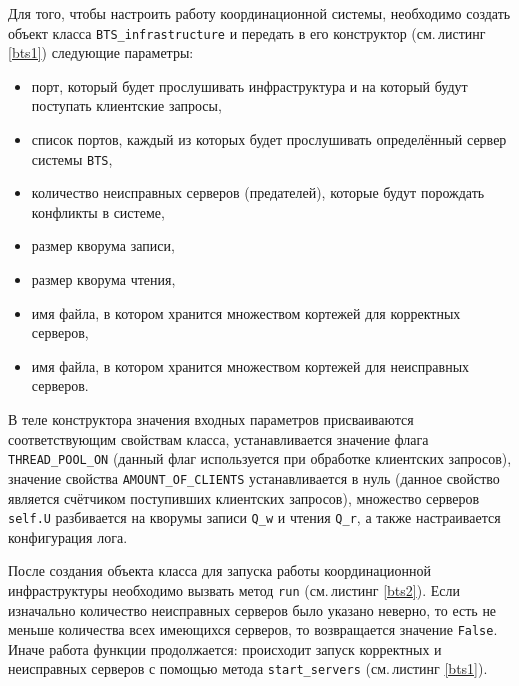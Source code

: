 Для того, чтобы настроить работу координационной системы, необходимо создать объект класса \texttt{BTS_infrastructure} и передать в его конструктор (см.\,листинг \ref{bts1}) следующие параметры:
\begin{itemize}
	\item порт, который будет прослушивать инфраструктура и на который будут поступать клиентские запросы,
	\item список портов, каждый из которых будет прослушивать определённый сервер системы \texttt{BTS},
	\item количество неисправных серверов (предателей), которые будут порождать конфликты в системе,
	\item размер кворума записи,
	\item размер кворума чтения,
	\item имя файла, в котором хранится множеством кортежей для корректных серверов,
	\item имя файла, в котором хранится множеством кортежей для неисправных серверов.
\end{itemize}
В теле конструктора значения входных параметров присваиваются соответствующим свойствам класса, устанавливается значение флага \texttt{THREAD_POOL_ON} (данный флаг используется при обработке клиентских запросов), значение свойства \texttt{AMOUNT_OF_CLIENTS} устанавливается в нуль (данное свойство является счётчиком поступивших клиентских запросов), множество серверов \texttt{self.U} разбивается на кворумы записи \texttt{Q_w} и чтения \texttt{Q_r}, а также настраивается конфигурация лога. 

После создания объекта класса для запуска работы координационной инфраструктуры необходимо вызвать метод \texttt{run} (см.\,листинг \ref{bts2}). Если изначально количество неисправных серверов было указано неверно, то есть не меньше количества всех имеющихся серверов, то возвращается значение \texttt{False}. Иначе работа функции продолжается: происходит запуск корректных и неисправных серверов с помощью метода \texttt{start_servers} (см.\,листинг \ref{bts1}).

